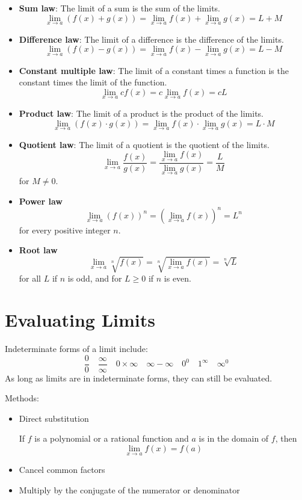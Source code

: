 
\begin{itemize}
\item \textbf{Sum law}: The limit of a sum is the sum of the limits.
\[ \lim_{x\to a}(f(x)+g(x)) = \lim_{x\to a}f(x) + \lim_{x\to a}g(x) = L+M \]

\item \textbf{Difference law}: The limit of a difference is the difference of the limits.
\[ \lim_{x\to a}(f(x)-g(x)) = \lim_{x\to a}f(x) - \lim_{x\to a}g(x) = L-M \]

\item \textbf{Constant multiple law}: The limit of a constant times a function is the constant times the limit of the function.
\[ \lim_{x\to a}cf(x) = c\lim_{x\to a}f(x) = cL \]

\item \textbf{Product law}: The limit of a product is the product of the limits.
\[ \lim_{x\to a}(f(x)\cdot g(x)) = \lim_{x\to a}f(x) \cdot \lim_{x\to a}g(x) = L\cdot M \]

\item \textbf{Quotient law}: The limit of a quotient is the quotient of the limits.
\[ \lim_{x\to a}\frac{f(x)}{g(x)} = \frac{\lim_{x\to a}f(x)}{\lim_{x\to a}g(x)} = \frac{L}{M} \]
for $M \neq 0$.

\item \textbf{Power law}
\[ \lim_{x\to a}(f(x))^n = (\lim_{x\to a}f(x))^n = L^n \]
for every positive integer $n$.

\item \textbf{Root law}
\[ \lim_{x\to a}\sqrt[n]{f(x)} = \sqrt[n]{\lim_{x\to a}f(x)} = \sqrt[n]{L} \]
for all $L$ if $n$ is odd, and for $L\ge 0$ if $n$ is even.
\end{itemize}
\pagebreak

\section{Evaluating Limits}
Indeterminate forms of a limit include:
\[ \frac{0}{0} \quad \frac{\infty}{\infty} \quad 0 \times \infty \quad \infty - \infty \quad 0^0 \quad 1^{\infty} \quad \infty^0 \]
As long as limits are in indeterminate forms, they can still be evaluated.

Methods:
\begin{itemize}
\item Direct substitution

If $f$ is a polynomial or a rational function and $a$ is in the domain of $f$, then
\[ \lim_{x\to a}f(x)=f(a) \]

\item Cancel common factors
\item Multiply by the conjugate of the numerator or denominator
\end{itemize}

